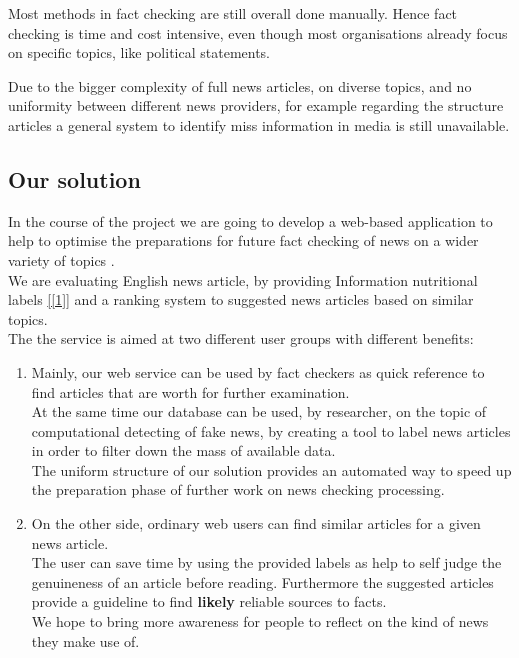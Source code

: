 \documentclass[10pt]{article}
\begin{document}
Most methods in fact checking are still overall done manually. 
Hence fact checking is time and cost intensive, even though most organisations already focus on specific topics, like political statements.

Due to the bigger complexity of full news articles, on diverse topics, and no uniformity between different news providers, for example regarding the structure articles
a general system to identify miss information in media is still unavailable.

\subsection{Our solution}
In the course of the project we are going to develop a web-based application to help to optimise the preparations for future fact checking of news on a wider variety of topics .\\
We are evaluating English news article, by providing \grqq{}Information nutritional labels\grqq{} \ref{[1]} and a ranking system to suggested news articles based on similar topics.\\
The the service is aimed at two different user groups with different benefits:
\begin{enumerate}
\item Mainly, our web service can be used by fact checkers as quick reference to find articles that are worth for further examination. \\
At the same time our database can be used, by researcher, on the topic of computational detecting of fake news, by creating a tool to label news articles in order to filter down the mass of available data.\\
The uniform structure of our solution provides an automated way to speed up the preparation phase of further work on news checking processing.
\item On the other side, ordinary web users can find similar articles for a given news article.\\
The user can save time by using the provided labels as help to self judge the genuineness of an article before reading.
Furthermore the suggested articles provide a guideline to find \textbf{likely} reliable sources to facts.\\
We hope to bring more awareness for people to reflect on the kind of news they make use of.
\end{enumerate}
\end{document}
